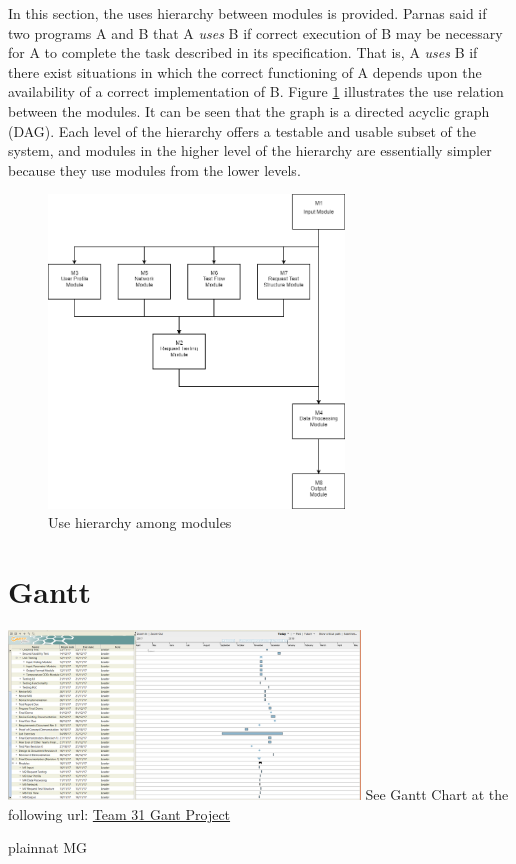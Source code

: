 \documentclass[12pt, titlepage]{article}
\begin{document}
In this section, the uses hierarchy between modules is
provided. Parnas said if two programs A and B that A {\em uses} B if
correct execution of B may be necessary for A to complete the task described in
its specification. That is, A {\em uses} B if there exist situations in which
the correct functioning of A depends upon the availability of a correct
implementation of B.  Figure \ref{FigUH} illustrates the use relation between
the modules. It can be seen that the graph is a directed acyclic graph
(DAG). Each level of the hierarchy offers a testable and usable subset of the
system, and modules in the higher level of the hierarchy are essentially simpler
because they use modules from the lower levels.

\begin{figure}[H]
\centering
\includegraphics[width=0.7\textwidth]{UsesHierarchy.png}
\caption{Use hierarchy among modules}
\label{FigUH}
\end{figure}
\section{Gantt}
\centering
\includegraphics[width=0.7\textwidth]{gantt.png}
\newline
	See Gantt Chart at the following url: \href{https://gitlab.cas.mcmaster.ca/myersd1/3xa3-team31/blob/master/ProjectSchedule/Team%2031%20Gantt%20Project.pdf}{Team 31 Gant Project}

 {plainnat}
 {MG}
\end{document}
